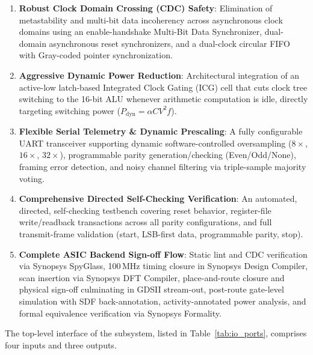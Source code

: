 \documentclass[11pt,a4paper]{article}
\begin{document}
\begin{enumerate}
    \item \textbf{Robust Clock Domain Crossing (CDC) Safety}: Elimination of metastability and multi-bit data incoherency across asynchronous clock domains using an enable-handshake Multi-Bit Data Synchronizer, dual-domain asynchronous reset synchronizers, and a dual-clock circular FIFO with Gray-coded pointer synchronization.
    \item \textbf{Aggressive Dynamic Power Reduction}: Architectural integration of an active-low latch-based Integrated Clock Gating (ICG) cell that cuts clock tree switching to the 16-bit ALU whenever arithmetic computation is idle, directly targeting switching power ($P_{\text{dyn}} = \alpha C V^2 f$).
    \item \textbf{Flexible Serial Telemetry \& Dynamic Prescaling}: A fully configurable UART transceiver supporting dynamic software-controlled oversampling ($8\times$, $16\times$, $32\times$), programmable parity generation/checking (Even/Odd/None), framing error detection, and noisy channel filtering via triple-sample majority voting.
    \item \textbf{Comprehensive Directed Self-Checking Verification}: An automated, directed, self-checking testbench covering reset behavior, register-file write/readback transactions across all parity configurations, and full transmit-frame validation (start, LSB-first data, programmable parity, stop).
    \item \textbf{Complete ASIC Backend Sign-off Flow}: Static lint and CDC verification via Synopsys SpyGlass, 100\,MHz timing closure in Synopsys Design Compiler, scan insertion via Synopsys DFT Compiler, place-and-route closure and physical sign-off culminating in GDSII stream-out, post-route gate-level simulation with SDF back-annotation, activity-annotated power analysis, and formal equivalence verification via Synopsys Formality.
\end{enumerate}

The top-level interface of the subsystem, listed in Table~\ref{tab:io_ports}, comprises four inputs and three outputs.
\end{document}
